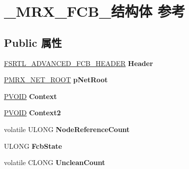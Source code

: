 \hypertarget{struct___m_r_x___f_c_b__}{}\section{\+\_\+\+M\+R\+X\+\_\+\+F\+C\+B\+\_\+结构体 参考}
\label{struct___m_r_x___f_c_b__}
\subsection*{Public 属性}
\begin{DoxyCompactItemize}
\item 
\mbox{\label{struct___m_r_x___f_c_b___af9e05ea2dcfea11f6b35371da5320f6e}} 
\hyperlink{struct___f_s_r_t_l___a_d_v_a_n_c_e_d___f_c_b___h_e_a_d_e_r}{F\+S\+R\+T\+L\+\_\+\+A\+D\+V\+A\+N\+C\+E\+D\+\_\+\+F\+C\+B\+\_\+\+H\+E\+A\+D\+ER} {\bfseries Header}
\item 
\mbox{\label{struct___m_r_x___f_c_b___ad995ae59b56cce4c958ccbaddebfb251}} 
\hyperlink{struct___m_r_x___n_e_t___r_o_o_t__}{P\+M\+R\+X\+\_\+\+N\+E\+T\+\_\+\+R\+O\+OT} {\bfseries p\+Net\+Root}
\item 
\mbox{\label{struct___m_r_x___f_c_b___a50a90bee1abea5d0c9c1a4bee1c5b648}} 
\hyperlink{interfacevoid}{P\+V\+O\+ID} {\bfseries Context}
\item 
\mbox{\label{struct___m_r_x___f_c_b___ab347f52aa6bb209f31a1aa63bfdeb653}} 
\hyperlink{interfacevoid}{P\+V\+O\+ID} {\bfseries Context2}
\item 
\mbox{\label{struct___m_r_x___f_c_b___a8a8414a599444a2266f5d4270c78c271}} 
volatile U\+L\+O\+NG {\bfseries Node\+Reference\+Count}
\item 
\mbox{\label{struct___m_r_x___f_c_b___a0a5aff8df75127733f8802591a764854}} 
U\+L\+O\+NG {\bfseries Fcb\+State}
\item 
\mbox{\label{struct___m_r_x___f_c_b___a6355893362800aecd91f4959634c8a21}} 
volatile C\+L\+O\+NG {\bfseries Unclean\+Count}
\item 
\mbox{\label{struct___m_r_x___f_c_b___ad473e32885d0278c21750fd9edea2ebf}} 

\end{DoxyCompactItemize}
